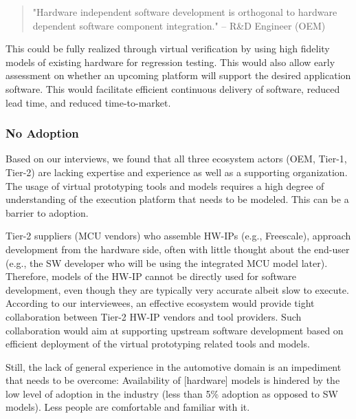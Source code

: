\begin{quote}
"Hardware independent software development is orthogonal to hardware dependent software component integration."
-- R\&D Engineer (OEM)
\end{quote}

This could be fully realized through virtual verification by using high fidelity models of existing hardware for regression testing. This would also allow early assessment on whether an upcoming platform will support the desired application software. This would facilitate efficient continuous delivery of software, reduced lead time, and reduced time-to-market.

\subsubsection{No Adoption}
Based on our interviews, we found that all three ecosystem actors (OEM, Tier-1, Tier-2) are lacking expertise and experience as well as a supporting organization.
The usage of virtual prototyping tools and models requires a high degree of understanding of the execution platform that needs to be modeled. This can be a barrier to adoption.

Tier-2 suppliers (MCU vendors) who assemble HW-IPs (e.g., Freescale), approach development from the hardware side, often with little thought about the end-user (e.g., the SW developer who will be using the integrated MCU model later). Therefore, models of the HW-IP cannot be directly used for software development, even though they are typically very accurate albeit slow to execute. According to our interviewees, an effective ecosystem would provide tight collaboration between Tier-2 HW-IP vendors and tool providers. Such collaboration would aim at supporting upstream software development based on efficient deployment of the virtual prototyping related tools and models.

Still, the lack of general experience in the automotive domain is an impediment that needs to be overcome:
Availability of [hardware] models is hindered by the low level of adoption in the industry (less than 5\% adoption as opposed to SW models). Less people are comfortable and familiar with it.

